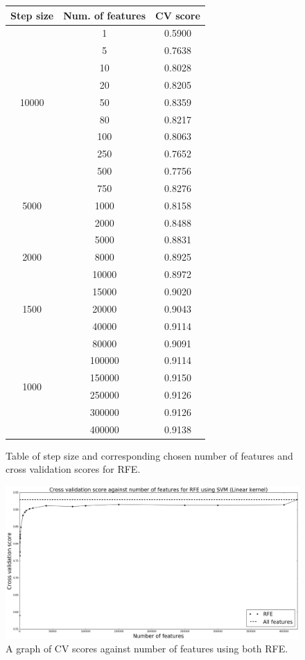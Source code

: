 \documentclass[12pt, twoside, a4paper]{report}
\begin{document}
\begin{figure}
\centering
    \begin{tabular}{ | c | c | c | } \hline
    Step size & Num. of features & CV score \\ \hline
    \multirow{9}{*}{10000} & 
  1 & 0.5900  \\
 & 5 & 0.7638   \\
 & 10 & 0.8028  \\
 & 20 & 0.8205  \\
 & 50 & 0.8359 \\
 & 80 & 0.8217 \\
 & 100 & 0.8063 \\
 & 250 & 0.7652 \\
 & 500 & 0.7756 \\ \hline
 
 \multirow{3}{*}{5000} & 
  750 & 0.8276  \\
 & 1000 & 0.8158 \\
 & 2000 & 0.8488 \\ \hline
 
 \multirow{3}{*}{2000} & 
  5000 & 0.8831 \\
 & 8000 & 0.8925 \\
 & 10000 & 0.8972 \\ \hline
 
 \multirow{3}{*}{1500} & 
  15000 & 0.9020 \\
 & 20000 & 0.9043 \\
 & 40000 & 0.9114 \\ \hline
 
 \multirow{6}{*}{1000} & 
  80000 & 0.9091 \\
 & 100000 & 0.9114 \\
 & 150000 & 0.9150 \\
  & 250000 & 0.9126 \\
   & 300000 & 0.9126 \\
    & 400000 & 0.9138 \\ \hline
    \end{tabular}
\caption{Table of step size and corresponding chosen number of features and cross validation scores for RFE.}
\label{rfe_results_table}
\end{figure}


\begin{figure}
\centering
\includegraphics[width=\textwidth]{images/rfe_linear_all.jpeg}
\caption{A graph of CV scores against number of features using both RFE.}
\label{body:rfe:graph}
\end{figure}
\end{document}
